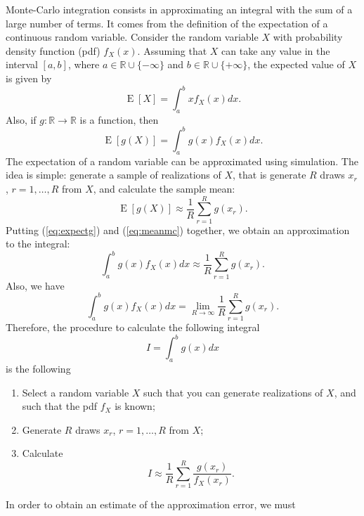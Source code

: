 \documentclass[12pt,a4paper]{article}
\newcommand{\req}[1]{(\ref{#1})}
\newcommand{\R}{\mathbb{R}}
\newcommand{\expect}{\operatorname{E}}
\begin{document}
Monte-Carlo integration consists in approximating an integral with the
sum of a
large number of terms. It comes from the definition of the expectation of
a continuous random variable. Consider the random variable $X$ with
probability density function (pdf) $f_X(x)$. Assuming that $X$ can take any
value in the interval $[a,b]$, where $a \in \R \cup \{ -\infty\}$ and $b
\in \R \cup \{+\infty \}$, the expected value of $X$ is given by
\begin{equation}
\label{eq:expect}
\expect[X] = \int_{a}^{b} x f_X(x) dx.
\end{equation}
Also, if $g:\R \to \R$ is a function, then 
\begin{equation}
\label{eq:expectg}
\expect[g(X)] = \int_{a}^{b} g(x) f_X(x) dx.
\end{equation}
The expectation of a random variable can be approximated using
simulation. The idea is simple: generate a sample of realizations of
$X$, that is generate $R$ draws $x_r$, $r=1,\ldots,
R$ from $X$, and calculate the sample mean:
\begin{equation}
\label{eq:meanmc}
\expect[g(X)] \approx \frac{1}{R} \sum_{r=1}^R g(x_r).
\end{equation}
Putting \req{eq:expectg} and \req{eq:meanmc} together, we obtain an
approximation to the integral:
\begin{equation}
 \int_{a}^{b} g(x) f_X(x) dx \approx  \frac{1}{R} \sum_{r=1}^R g(x_r).
\end{equation}
Also, we have 
\begin{equation}
 \int_{a}^{b} g(x) f_X(x) dx = \lim_{R\to\infty}  \frac{1}{R} \sum_{r=1}^R g(x_r).
\end{equation}
Therefore, the procedure to calculate the following integral
\begin{equation}
I = \int_a^b g(x) dx
\end{equation}
is the following
\begin{enumerate}
\item Select a random variable $X$ such that you can generate 
realizations of $X$, and such that the pdf $f_X$ is known;
\item Generate $R$ draws $x_r$, $r=1,\ldots,R$ from $X$;
\item Calculate
\begin{equation}
I \approx \frac{1}{R} \sum_{r=1}^R \frac{g(x_r)}{f_X(x_r)}.
\end{equation}
\end{enumerate}
In order to obtain an estimate of the approximation error, we must
\end{document}
